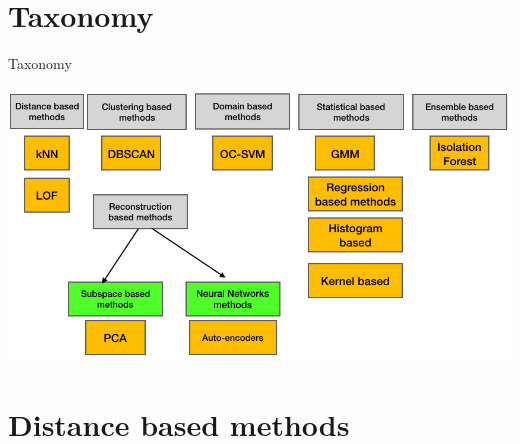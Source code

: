 \documentclass[10pt]{beamer}
\begin{document}
%

\section{Taxonomy}
\begin{frame}{Taxonomy}
\begin{center}
\includegraphics[width=.95\columnwidth]{TaxonomyOutliers}
\end{center}
\end{frame}


\section{Distance based methods}
\end{document}
